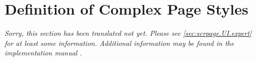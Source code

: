 \section{Definition of Complex Page Styles}
\label{sec:scrlayer-scrpage.pagestyle.experts}
 
\emph{Sorry, this section has been translated not yet. Please see
  \autoref{sec:scrpage.UI.expert} for at least some
  information. Additional information may be found in the implementation
  manual .}

%
%


